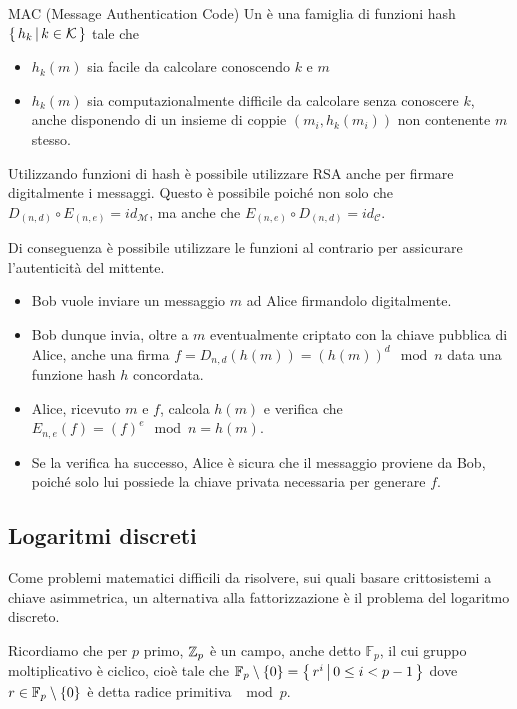 \begin{definition}{MAC (Message Authentication Code)}
  Un  è una famiglia di funzioni hash \(\set{h_k}[k\in \mathcal{K}]\) tale che
  \begin{itemize}
    \item \(h_k (m)\) sia facile da calcolare conoscendo \(k\) e \(m\)
    \item \(h_k (m)\) sia computazionalmente difficile da calcolare senza conoscere \(k\), anche disponendo di un insieme di coppie \((m_i, h_k(m_i))\) non contenente \(m\) stesso.
  \end{itemize}
\end{definition}

Utilizzando funzioni di hash è possibile utilizzare RSA anche per firmare digitalmente i messaggi. Questo è possibile poiché non solo che \(D_{(n,d)} \circ E_{(n,e)} = id_{\mathcal{M}}\), ma anche che \(E_{(n,e)} \circ D_{(n,d)} = id_{\mathcal{C}}\).

Di conseguenza è possibile utilizzare le funzioni al contrario per assicurare l'autenticità del mittente.
\begin{itemize}
  \item Bob vuole inviare un messaggio \(m\) ad Alice firmandolo digitalmente.
  \item Bob dunque invia, oltre a \(m\) eventualmente criptato con la chiave pubblica di Alice, anche una firma \(f = D_{n,d}(h(m)) = {(h(m))}^d \mod n\) data una funzione hash \(h\) concordata.
  \item Alice, ricevuto \(m\) e \(f\), calcola \(h(m)\) e verifica che \(E_{n,e}(f) = {(f)}^e \mod n = h(m)\).
  \item Se la verifica ha successo, Alice è sicura che il messaggio proviene da Bob, poiché solo lui possiede la chiave privata necessaria per generare \(f\).
\end{itemize}

\subsection{Logaritmi discreti}

Come problemi matematici difficili da risolvere, sui quali basare crittosistemi a chiave asimmetrica, un alternativa alla fattorizzazione è il problema del logaritmo discreto.

Ricordiamo che per \(p\) primo, \(\mathbb{Z}_p\) è un campo, anche detto \(\mathbb{F}_p\), il cui gruppo moltiplicativo è ciclico, cioè tale che 
\(\mathbb{F}_p\setminus\set{0} = \set {r^i}[0\leq i < p-1]\) dove \(r \in \mathbb{F}_p\setminus\set{0}\) è detta radice primitiva \(\mod p\).

